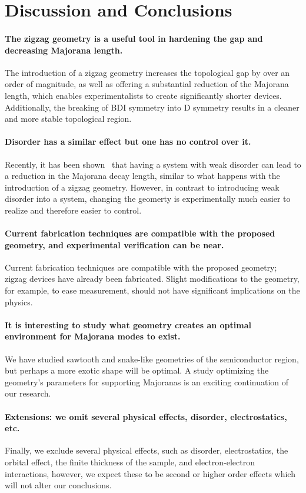 \documentclass[english, twocolumn, 10pt, aps, superscriptaddress, floatfix, prb, citeautoscript]{revtex4-1}
\renewcommand{\comment}[2]{#2}
\renewcommand{\comment}{\paragraph}
\begin{document}
\section{Discussion and Conclusions}

\comment{The zigzag geometry is a useful tool in hardening the gap and decreasing Majorana length.}
The introduction of a zigzag geometry increases the topological gap by over an order of magnitude, as well as offering a substantial reduction of the Majorana length, which enables experimentalists to create significantly shorter devices.
Additionally, the breaking of BDI symmetry into D symmetry results in a cleaner and more stable topological region.

\comment{Disorder has a similar effect but one has no control over it.}
Recently, it has been shown~\cite{haim_double-edge_2018} that having a system with weak disorder can lead to a reduction in the Majorana decay length, similar to what happens with the introduction of a zigzag geometry.
However, in contrast to introducing weak disorder into a system, changing the geomerty is experimentally much easier to realize and therefore easier to control.

\comment{Current fabrication techniques are compatible with the proposed geometry, and experimental verification can be near.}
Current fabrication techniques are compatible with the proposed geometry; zigzag devices have already been fabricated. %
Slight modifications to the geometry, for example, to ease measurement, should not have significant implications on the physics.

\comment{It is interesting to study what geometry creates an optimal environment for Majorana modes to exist.}
We have studied sawtooth and snake-like geometries of the semiconductor region, but perhaps a more exotic shape will be optimal.
A study optimizing the geometry's parameters for supporting Majoranas is an exciting continuation of our research.

\comment{Extensions: we omit several physical effects, disorder, electrostatics, etc.}
Finally, we exclude several physical effects, such as disorder, electrostatics, the orbital effect, the finite thickness of the sample, and electron-electron interactions, however, we expect these to be second or higher order effects which will not alter our conclusions.
\end{document}
